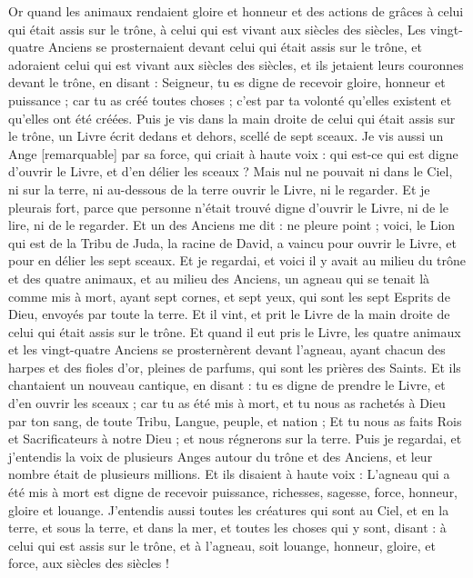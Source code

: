 \begin{multicols}{2}
Or quand les animaux rendaient gloire et honneur et des actions de grâces à celui qui était assis sur le trône, à celui qui est vivant aux siècles des siècles,
Les vingt-quatre Anciens se prosternaient devant celui qui était assis sur le trône, et adoraient celui qui est vivant aux siècles des siècles, et ils jetaient leurs couronnes devant le trône, en disant :
Seigneur, tu es digne de recevoir gloire, honneur et puissance ; car tu as créé toutes choses ; c'est par ta volonté qu'elles existent et qu'elles ont été créées.
\VerseOne{}Puis je vis dans la main droite de celui qui était assis sur le trône, un Livre écrit dedans et dehors, scellé de sept sceaux.
Je vis aussi un Ange [remarquable] par sa force, qui criait à haute voix : qui est-ce qui est digne d'ouvrir le Livre, et d'en délier les sceaux ?
Mais nul ne pouvait ni dans le Ciel, ni sur la terre, ni au-dessous de la terre ouvrir le Livre, ni le regarder.
Et je pleurais fort, parce que personne n'était trouvé digne d'ouvrir le Livre, ni de le lire, ni de le regarder.
Et un des Anciens me dit : ne pleure point ; voici, le Lion qui est de la Tribu de Juda, la racine de David, a vaincu pour ouvrir le Livre, et pour en délier les sept sceaux.
Et je regardai, et voici il y avait au milieu du trône et des quatre animaux, et au milieu des Anciens, un agneau qui se tenait là comme mis à mort, ayant sept cornes, et sept yeux, qui sont les sept Esprits de Dieu, envoyés par toute la terre.
Et il vint, et prit le Livre de la main droite de celui qui était assis sur le trône.
Et quand il eut pris le Livre, les quatre animaux et les vingt-quatre Anciens se prosternèrent devant l'agneau, ayant chacun des harpes et des fioles d'or, pleines de parfums, qui sont les prières des Saints.
Et ils chantaient un nouveau cantique, en disant : tu es digne de prendre le Livre, et d'en ouvrir les sceaux ; car tu as été mis à mort, et tu nous as rachetés à Dieu par ton sang, de toute Tribu, Langue, peuple, et nation ;
Et tu nous as faits Rois et Sacrificateurs à notre Dieu ; et nous régnerons sur la terre.
Puis je regardai, et j'entendis la voix de plusieurs Anges autour du trône et des Anciens, et leur nombre était de plusieurs millions.
Et ils disaient à haute voix : L'agneau qui a été mis à mort est digne de recevoir puissance, richesses, sagesse, force, honneur, gloire et louange.
J'entendis aussi toutes les créatures qui sont au Ciel, et en la terre, et sous la terre, et dans la mer, et toutes les choses qui y sont, disant : à celui qui est assis sur le trône, et à l'agneau, soit louange, honneur, gloire, et force, aux siècles des siècles !

\end{multicols}
